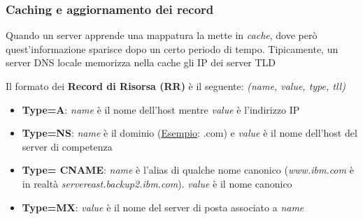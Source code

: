 \documentclass{article}
\newcounter{subsubsubsection}[subsubsection]
\begin{document}
            \subsubsection{Caching e aggiornamento dei record}
                Quando un server apprende una mappatura la mette in \textit{cache}, dove però quest'informazione sparisce dopo un certo periodo di tempo. Tipicamente, un server DNS locale memorizza nella cache gli IP dei server TLD

                    Il formato dei \textbf{Record di Risorsa (RR)} è il seguente: \textit{(name, value, type, tll)}
                    \begin{itemize}
                        \item \textbf{Type=A}: \textit{name} è il nome dell'host mentre \textit{value} è l'indirizzo IP
                        \item \textbf{Type=NS}: \textit{name} è il dominio (\underline{Esempio}: .com) e \textit{value} è il nome dell'host del server di competenza
                        \item \textbf{Type= CNAME}: \textit{name} è l'alias di qualche nome canonico (\textit{www.ibm.com} è in realtà \textit{servereast.backup2.ibm.com}). \textit{value} è il nome canonico
                        \item \textbf{Type=MX}: \textit{value} è il nome del server di posta associato a \textit{name}
                    \end{itemize}
\end{document}
